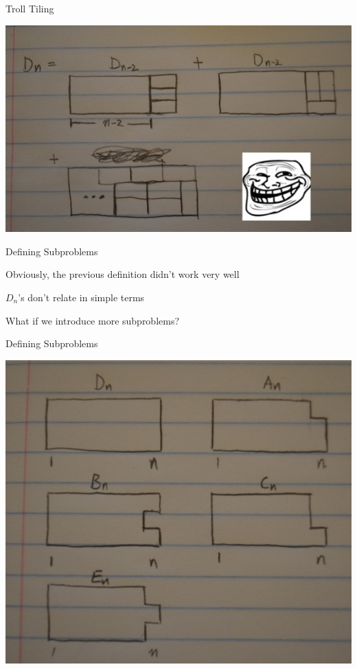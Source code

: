 \documentclass[13pt,onlymath]{beamer}
\begin{document}
\begin{frame}{Troll Tiling}
\begin{center}
\includegraphics[height=0.7\textheight]{figures/trolltiling.jpg}
\end{center}
\end{frame}

\begin{frame}{Defining Subproblems}
\BIT
\item Obviously, the previous definition didn't work very well
\item $D_n$'s don't relate in simple terms
\vfill
\item What if we introduce more subproblems?
\EIT
\end{frame}

\begin{frame}{Defining Subproblems}
\begin{center}
\includegraphics[height=0.7\textheight]{figures/tritiling_sub1.jpg}
\end{center}
\end{frame}
\end{document}
